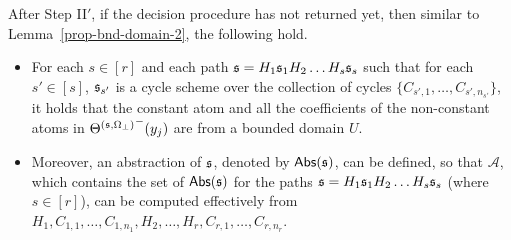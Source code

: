 After Step II$'$, if the decision procedure has not returned yet, then similar to Lemma~\ref{prop-bnd-domain-2}, the following hold.
\begin{itemize}
\item For each $s \in [r]$ and each path ${\mathfrak{s} }=H_1 {\mathfrak{s} }_1 H_2 \dots H_s {\mathfrak{s} }_s$ such that for each $s'\in [s]$, ${\mathfrak{s} }_{s'}$ is a cycle scheme over the collection of cycles $\{C_{s',1},\dots,C_{s',n_{s'}}\}$, it holds that the constant atom and all the coefficients of the non-constant atoms in ${\Theta^{({\mathfrak{s} },\Omega_\bot)}}^-(y_j)$ are from a bounded domain $U$.
%
\item Moreover,  an abstraction of ${\mathfrak{s} }$, denoted by $\mathsf{Abs}({\mathfrak{s} })$, can be defined, so that $\mathscr{A}$, which contains the set of $\mathsf{Abs}({\mathfrak{s} })$ for the paths ${\mathfrak{s} }=H_1 {\mathfrak{s} }_1 H_2 \dots H_s {\mathfrak{s} }_s$ (where $s \in [r]$), can be computed effectively from 
$H_1, C_{1,1}, \dots, C_{1,n_1},H_2,\dots, H_r,C_{r,1},\dots, C_{r,n_r}$.
\end{itemize}

